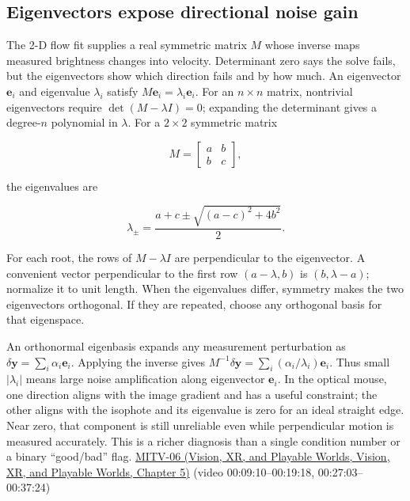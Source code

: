 \subsection{Eigenvectors expose directional noise gain}\label{04-visual-computing-ii-ch030-eigenvectors-expose-directional-noise-gain}

The 2-D flow fit supplies a real symmetric matrix \(M\) whose inverse maps measured brightness changes into velocity. Determinant zero says the solve fails, but the eigenvectors show which direction fails and by how much. An eigenvector \(\mathbf e_i\) and eigenvalue \(\lambda_i\) satisfy \(M\mathbf e_i=\lambda_i\mathbf e_i\). For an \(n\times n\) matrix, nontrivial eigenvectors require \(\det(M-\lambda I)=0\); expanding the determinant gives a degree-\(n\) polynomial in \(\lambda\). For a \(2\times2\) symmetric matrix

\[
M=\begin{bmatrix}a&b\\b&c\end{bmatrix},
\]

the eigenvalues are

\[
\lambda_{\pm}=\frac{a+c\pm\sqrt{(a-c)^2+4b^2}}{2}.
\]

For each root, the rows of \(M-\lambda I\) are perpendicular to the eigenvector. A convenient vector perpendicular to the first row \((a-\lambda,b)\) is \((b,\lambda-a)\); normalize it to unit length. When the eigenvalues differ, symmetry makes the two eigenvectors orthogonal. If they are repeated, choose any orthogonal basis for that eigenspace.

An orthonormal eigenbasis expands any measurement perturbation as \(\delta\mathbf y=\sum_i \alpha_i\mathbf e_i\). Applying the inverse gives \(M^{-1}\delta\mathbf y=\sum_i (\alpha_i/\lambda_i)\mathbf e_i\). Thus small \(|\lambda_i|\) means large noise amplification along eigenvector \(\mathbf e_i\). In the optical mouse, one direction aligns with the image gradient and has a useful constraint; the other aligns with the isophote and its eigenvalue is zero for an ideal straight edge. Near zero, that component is still unreliable even while perpendicular motion is measured accurately. This is a richer diagnosis than a single condition number or a binary ``good/bad'' flag. \href{../07-Vision-XR-and-Playable-Worlds/main.pdf\#nameddest=04-visual-computing-ii-ch036-mitv-06---photometric-stereo-noise-gain-error-amplification-eigenvalues-and-eigenvectors-review}{MITV-06 (Vision, XR, and Playable Worlds, Vision, XR, and Playable Worlds, Chapter 5)} (video 00:09:10--00:19:18, 00:27:03--00:37:24)

